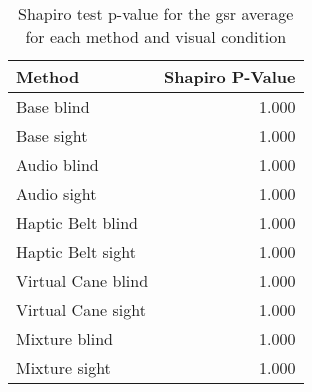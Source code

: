 
\begin{table}[!htb]
\centering
\caption{Shapiro test p-value for the gsr average for each method and visual condition}
\label{tab:shapiro_gsr}
\begin{tabular}{lr}
\toprule
            Method &  Shapiro P-Value \\
\midrule
        Base blind &            1.000 \\
        Base sight &            1.000 \\
       Audio blind &            1.000 \\
       Audio sight &            1.000 \\
 Haptic Belt blind &            1.000 \\
 Haptic Belt sight &            1.000 \\
Virtual Cane blind &            1.000 \\
Virtual Cane sight &            1.000 \\
     Mixture blind &            1.000 \\
     Mixture sight &            1.000 \\
\bottomrule
\end{tabular}
\end{table}

